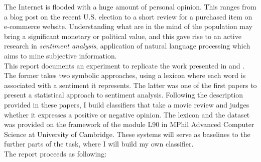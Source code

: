 The Internet is flooded with a huge amount of personal opinion. This ranges from a blog post on the recent U.S. election to a short review for a purchased item on e-commerce website. Understanding what are in the mind of the population may bring a significant monetary or political value, and this gave rise to an active research in {\em sentiment analysis}, application of natural language processing which aims to mine subjective information. \\
This report documents an experiment to replicate the work presented in \cite{wilson2005recognizing} and \cite{pang2002thumbs}. The former takes two symbolic approaches, using a lexicon where each word is associated with a sentiment it represents. The latter was one of the first papers to present a statistical approach to sentiment analysis. Following the description provided in these papers, I build classifiers that take a movie review and judges whether it expresses a positive or negative opinion. The lexicon and the dataset was provided on the framework of the module L90 in MPhil Advanced Computer Science at University of Cambridge. These systems will serve as baselines to the further parts of the task, where I will build my own classifier.\\
The report proceeds as following: %